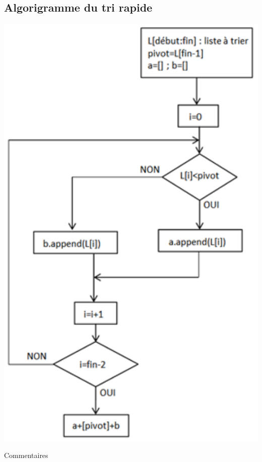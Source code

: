 \documentclass[t,11pt]{article}
\begin{document}
\subsection{Algorigramme du tri rapide}

\begin{minipage}{.5\textwidth}%
\begin{center}
\includegraphics[width=1\textwidth]{images/algorigramme_rapide.png}
\end{center}
\end{minipage}%
\hfill
\begin{minipage}{.45\textwidth}%
\vspace*{0.6cm}
\begin{python}
Commentaires
\vspace*{13cm}
\end{python}
\end{minipage}
\end{document}
